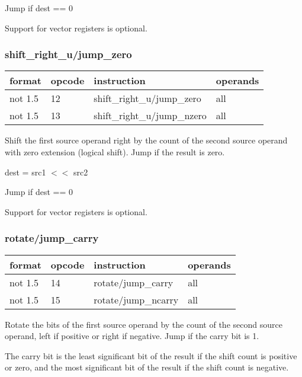 \documentclass[forwardcom.tex]{subfiles}
\begin{document}
Jump if dest == 0
\vspace{2mm}

Support for vector registers is optional.


\subsubsection{shift\_right\_u/jump\_zero}
\label{table:shiftRightUJumpZeroInstruction}
\begin{tabular}{|p{16mm}|p{12mm}|p{60mm}|p{50mm}|}
\hline
\bfseries format & \bfseries opcode & \bfseries instruction & \bfseries operands \\ \hline
not 1.5 & 12 & shift\_right\_u/jump\_zero & all \\ \hline
not 1.5 & 13 & shift\_right\_u/jump\_nzero & all \\ \hline
\end{tabular}
\vspace{2mm}

Shift the first source operand right by the count of the second source operand with zero extension (logical shift). Jump if the result is zero.
\vspace{2mm}

dest = src1 $<<$ src2

Jump if dest == 0
\vspace{2mm}

Support for vector registers is optional.


\subsubsection{rotate/jump\_carry}
\label{table:rotateJumpCarryInstruction}
\begin{tabular}{|p{16mm}|p{12mm}|p{60mm}|p{50mm}|}
\hline
\bfseries format & \bfseries opcode & \bfseries instruction & \bfseries operands \\ \hline
not 1.5 & 14 & rotate/jump\_carry & all \\ \hline
not 1.5 & 15 & rotate/jump\_ncarry & all \\ \hline
\end{tabular}
\vspace{2mm}

Rotate the bits of the first source operand by the count of the second source operand, left if positive or right if negative. Jump if the carry bit is 1.
\vspace{2mm}

The carry bit is the least significant bit of the result if the shift count is positive or zero, and the most significant bit of the result if the shift count is negative.
\vspace{2mm}
\end{document}
